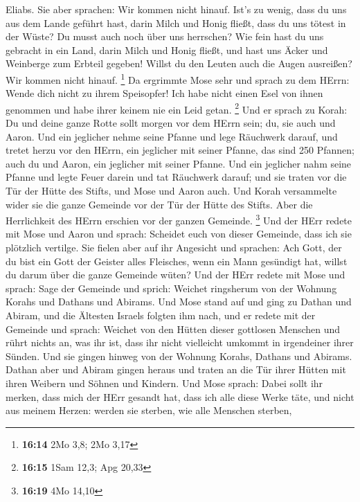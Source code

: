 Eliabs. Sie aber sprachen: Wir kommen nicht hinauf.  Ist's
zu wenig, dass du uns aus dem Lande geführt hast, darin Milch und Honig
fließt, dass du uns tötest in der Wüste? Du musst auch noch über uns
herrschen?  Wie fein hast du uns gebracht in ein Land,
darin Milch und Honig fließt, und hast uns Äcker und Weinberge zum
Erbteil gegeben! Willst du den Leuten auch die Augen ausreißen? Wir
kommen nicht hinauf. \footnote{\textbf{16:14} 2Mo 3,8; 2Mo 3,17}
 Da ergrimmte Mose sehr und sprach zu dem HErrn: Wende dich
nicht zu ihrem Speisopfer! Ich habe nicht einen Esel von ihnen genommen
und habe ihrer keinem nie ein Leid getan. \footnote{\textbf{16:15} 1Sam
  12,3; Apg 20,33}  Und er sprach zu Korah: Du und deine
ganze Rotte sollt morgen vor dem HErrn sein; du, sie auch und Aaron.
 Und ein jeglicher nehme seine Pfanne und lege Räuchwerk
darauf, und tretet herzu vor den HErrn, ein jeglicher mit seiner Pfanne,
das sind 250 Pfannen; auch du und Aaron, ein jeglicher mit seiner
Pfanne.  Und ein jeglicher nahm seine Pfanne und legte
Feuer darein und tat Räuchwerk darauf; und sie traten vor die Tür der
Hütte des Stifts, und Mose und Aaron auch.  Und Korah
versammelte wider sie die ganze Gemeinde vor der Tür der Hütte des
Stifts. Aber die Herrlichkeit des HErrn erschien vor der ganzen
Gemeinde. \footnote{\textbf{16:19} 4Mo 14,10}  Und der HErr
redete mit Mose und Aaron und sprach:  Scheidet euch von
dieser Gemeinde, dass ich sie plötzlich vertilge.  Sie
fielen aber auf ihr Angesicht und sprachen: Ach Gott, der du bist ein
Gott der Geister alles Fleisches, wenn ein Mann gesündigt hat, willst du
darum über die ganze Gemeinde wüten?  Und der HErr redete
mit Mose und sprach:  Sage der Gemeinde und sprich: Weichet
ringsherum von der Wohnung Korahs und Dathans und Abirams. 
Und Mose stand auf und ging zu Dathan und Abiram, und die Ältesten
Israels folgten ihm nach,  und er redete mit der Gemeinde
und sprach: Weichet von den Hütten dieser gottlosen Menschen und rührt
nichts an, was ihr ist, dass ihr nicht vielleicht umkommt in irgendeiner
ihrer Sünden.  Und sie gingen hinweg von der Wohnung
Korahs, Dathans und Abirams. Dathan aber und Abiram gingen heraus und
traten an die Tür ihrer Hütten mit ihren Weibern und Söhnen und Kindern.
 Und Mose sprach: Dabei sollt ihr merken, dass mich der
HErr gesandt hat, dass ich alle diese Werke täte, und nicht aus meinem
Herzen:  werden sie sterben, wie alle Menschen sterben,
